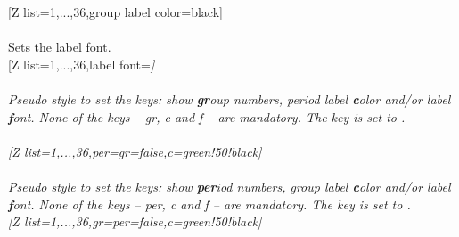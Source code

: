[Z list={1,...,36},group label color=black]%
\\ [10pt]\makebox[\linewidth][c]{\scalebox{.6}{\pgfPT[Z list={1,...,36},group label color=black]}}%
\\ [0pt]\pgfPTendoption%
\vfill%
\label{option_label font}%
%
{Sets the label font.}%
\\ [5pt][Z list={1,...,36},label font=\string\itshape]%
\\ [10pt]\makebox[\linewidth][c]{\scalebox{.6}{\pgfPT[Z list={1,...,36},label font=\itshape]}}%
\\ [0pt]\pgfPTendoption%
\vfill%
\label{style_per}%
%
{\textit{Pseudo style} to set the keys: show \textbf{gr}oup numbers, period label \textbf{c}olor and/or label \textbf{f}ont. None of the \textit{keys} -- gr, c and f -- are mandatory.
The key  is set to .
\\ [3pt]%
}%
\\ [5pt][Z list={1,...,36},per={gr=false,c=green!50!black}]%
\\ [10pt]\makebox[\linewidth][c]{\scalebox{.6}{\pgfPT[Z list={1,...,36},per={gr=false,c=green!50!black}]}}%
\\ [0pt]\pgfPTendstyle%
\vfill%
\label{style_gr}%
%
{\textit{Pseudo style} to set the keys: show \textbf{per}iod numbers, group label \textbf{c}olor and/or label \textbf{f}ont. None of the \textit{keys} -- per, c and f -- are mandatory.
The key  is set to .
\\ [3pt]%
}%
\vfill%
\newpage%
[Z list={1,...,36},gr={per=false,c=green!50!black}]%
